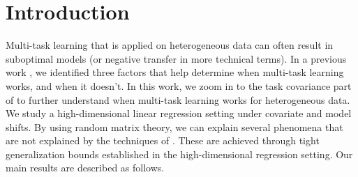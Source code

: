\section{Introduction}

Multi-task learning that is applied on heterogeneous data can often result in suboptimal models (or negative transfer in more technical terms).
In a previous work \cite{WZR20}, we identified three factors that help determine when multi-task learning works, and when it doesn't.
In this work, we zoom in to the task covariance part of \cite{WZR20} to further understand when multi-task learning works for heterogeneous data.
We study a high-dimensional linear regression setting under covariate and model shifts.
By using random matrix theory, we can explain several phenomena that are not explained by the techniques of \cite{WZR20}.
These are achieved through tight generalization bounds established in the high-dimensional regression setting.
Our main results are described as follows.
